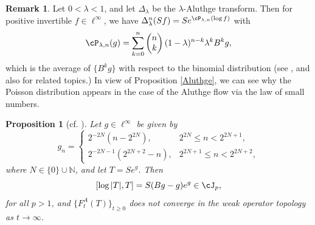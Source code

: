 \documentclass[12pt]{article}
\newtheorem{proposition}[theorem]{Proposition}
\theoremstyle{definition}
\newtheorem{remark}[theorem]{Remark}
\numberwithin{equation}{section}
\newcommand{\N}{\mathbb{N}}
\begin{document}
\begin{remark}
Let $0<\lambda<1$, and let $\Delta_\lambda$ be the $\lambda$-Aluthge transform. 
Then for positive invertible $f\in \ell^\infty$, we have $\Delta_\lambda^n(Sf)=Se^{\cP_{\lambda,n}(\log f)}$ with 
\[\cP_{\lambda,n}(g)=\sum_{k=0}^n \begin{pmatrix}
	n \\
	k
\end{pmatrix}
(1-\lambda)^{n-k}\lambda^k B^{k}g,\]
which is the average of $\{B^{k}g\}$ with respect to the binomial distribution 
(see \cite{CJL2005}, and also \cite{OY2025} for related topics.)   
In view of Proposition \ref{Aluthge}, we can see why the Poisson distribution appears in the case of the Aluthge flow   
via the law of small numbers. 
\end{remark}

\begin{proposition}[cf. {\cite[Corollary 3.3]{CJL2005}}] Let $g\in \ell^\infty$ be given by 
\[g_n=\begin{cases}
	2^{-2N}(n-2^{2N}),  &  2^{2N}\leq n < 2^{2N+1},\\
	2^{-2N-1}(2^{2N+2}-n),  &  2^{2N+1}\leq n< 2^{2N+2},
\end{cases} 
\]
where $N\in \{0\}\cup\N$, and let $T=Se^g$. 
Then 
\[[\log|T|,T] =S(Bg-g)e^g\in \cJ_p,\]
for all $p>1$, and $\{F^A_t(T)\}_{t\geq 0}$ does not converge in the weak operator topology as $t\to \infty$. 
\end{proposition}
\end{document}
